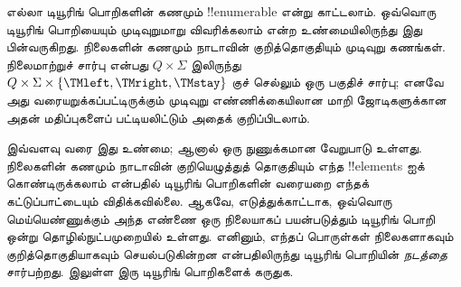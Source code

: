 \documentclass[../../../include/open-logic-section]{subfiles}
\begin{document}


\begin{explain}
எல்லா டியூரிங் பொறிகளின் கணமும் !!{enumerable} என்று காட்டலாம்.
ஒவ்வொரு டியூரிங் பொறியையும் முடிவுறுமாறு விவரிக்கலாம் என்ற உண்மையிலிருந்து
இது பின்வருகிறது. நிலைகளின் கணமும் நாடாவின் குறித்தொகுதியும் முடிவுறு
கணங்கள். நிலைமாற்றுச் சார்பு என்பது $Q \times \Sigma$ இலிருந்து
$Q \times \Sigma \times \{\TMleft, \TMright, \TMstay\}$ குச் செல்லும்
ஒரு பகுதிச் சார்பு; எனவே அது வரையறுக்கப்பட்டிருக்கும் முடிவுறு
எண்ணிக்கையிலான மாறி ஜோடிகளுக்கான அதன் மதிப்புகளைப் பட்டியலிட்டும்
அதைக் குறிப்பிடலாம்.

இவ்வளவு வரை இது உண்மை; ஆனால் ஒரு நுணுக்கமான வேறுபாடு உள்ளது.
நிலைகளின் கணமும் நாடாவின் குறியெழுத்துத் தொகுதியும் எந்த
!!{element}s ஐக் கொண்டிருக்கலாம் என்பதில் டியூரிங் பொறிகளின் வரையறை
எந்தக் கட்டுப்பாட்டையும் விதிக்கவில்லை. ஆகவே, எடுத்துக்காட்டாக,
ஒவ்வொரு மெய்யெண்ணுக்கும் அந்த எண்ணை ஒரு நிலையாகப் பயன்படுத்தும்
டியூரிங் பொறி ஒன்று தொழில்நுட்பமுறையில் உள்ளது. எனினும், எந்தப்
பொருள்கள் நிலைகளாகவும் குறித்தொகுதியாகவும் செயல்படுகின்றன என்பதிலிருந்து
டியூரிங் பொறியின் \emph{நடத்தை} சார்பற்றது. 
இலுள்ள இரு டியூரிங் பொறிகளைக் கருதுக.
\begin{figure}
\begin{center}
\\
\end{center}
\end{figure}
\end{explain}
\end{document}
